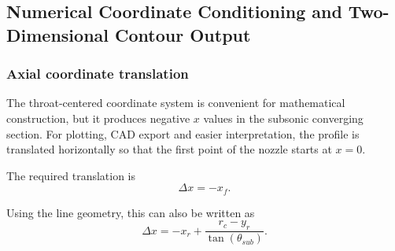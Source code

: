 \subsection{Numerical Coordinate Conditioning and Two-Dimensional Contour Output}


\subsubsection{Axial coordinate translation}

The throat-centered coordinate system is convenient for mathematical construction, but it produces negative $x$ values in the subsonic converging section. For plotting, CAD export and easier interpretation, the profile is translated horizontally so that the first point of the nozzle starts at $x=0$.

The required translation is
\begin{equation}
\Delta x=-x_f.
\label{eq:translation_simple}
\end{equation}

Using the line geometry, this can also be written as
\begin{equation}
\Delta x=-x_r+\frac{r_c-y_r}{\tan(\theta_{sub})}.
\label{eq:translation}
\end{equation}

